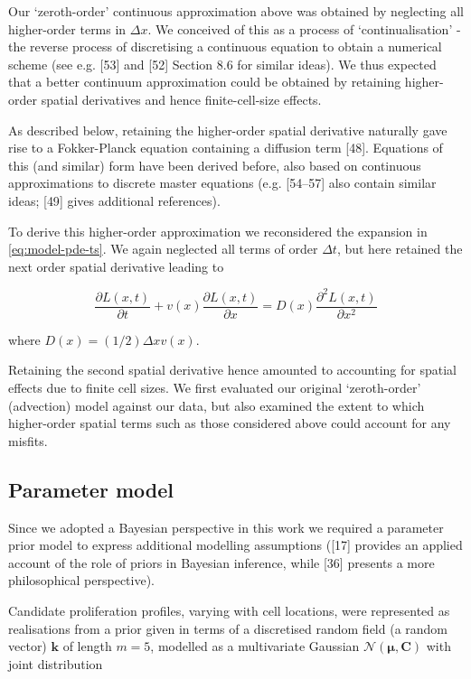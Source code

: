 \documentclass[10pt,letterpaper]{article}
\begin{document}
Our `zeroth-order' continuous approximation above was obtained by
neglecting all higher-order terms in \(\Delta x\). We conceived of this
as a process of `continualisation' - the reverse process of discretising
a continuous equation to obtain a numerical scheme (see e.g. {[}53{]}
and {[}52{]} Section 8.6 for similar ideas). We thus expected that a
better continuum approximation could be obtained by retaining
higher-order spatial derivatives and hence finite-cell-size effects.

As described below, retaining the higher-order spatial derivative
naturally gave rise to a Fokker-Planck equation containing a diffusion
term {[}48{]}. Equations of this (and similar) form have been derived
before, also based on continuous approximations to discrete master
equations (e.g. {[}54--57{]} also contain similar ideas; {[}49{]} gives
additional references).

To derive this higher-order approximation we reconsidered the expansion
in \ref{eq:model-pde-ts}. We again neglected all terms of order
\(\Delta t\), but here retained the next order spatial derivative
leading to

\begin{equation}\frac{\partial L(x,t)}{\partial t} + v(x)\frac{\partial L(x,t)}{\partial x} = D(x)\frac{\partial^2 L(x,t)}{\partial x^2}\label{eq:model-pde-higher-two}\end{equation}

where \(D(x) = (1/2)\Delta x v(x)\).

Retaining the second spatial derivative hence amounted to accounting for
spatial effects due to finite cell sizes. We first evaluated our
original `zeroth-order' (advection) model against our data, but also
examined the extent to which higher-order spatial terms such as those
considered above could account for any misfits.

\subsection{Parameter model}\label{parameter-model}

Since we adopted a Bayesian perspective in this work we required a
parameter prior model to express additional modelling assumptions
({[}17{]} provides an applied account of the role of priors in Bayesian
inference, while {[}36{]} presents a more philosophical perspective).

Candidate proliferation profiles, varying with cell locations, were
represented as realisations from a prior given in terms of a discretised
random field (a random vector) \(\mathbf{k}\) of length \(m=5\),
modelled as a multivariate Gaussian
\(\mathcal{N}(\symbf{\mu},\mathbf{C})\) with joint distribution
\end{document}

